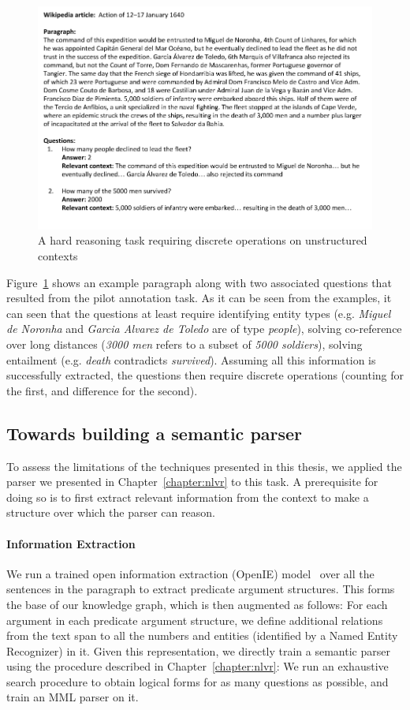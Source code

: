 \begin{figure}
	\includegraphics[width=\textwidth]{figures/drop_example.png}
	\caption{A hard reasoning task requiring discrete operations on
unstructured contexts}\label{fig:drop_example}
\end{figure}

Figure~\ref{fig:drop_example} shows an example paragraph along with two
associated questions that resulted from the pilot annotation task. As it can be
seen from the examples, it can seen that the questions at least require identifying entity types (e.g.
\textit{Miguel de Noronha} and \textit{Garcia Alvarez de Toledo} are of type
\textit{people}), solving co-reference over long distances (\textit{3000 men}
refers to a subset of \textit{5000 soldiers}), solving entailment (e.g.
\textit{death} contradicts \textit{survived}). Assuming all this information is
successfully extracted, the questions then require discrete operations (counting
for the first, and difference for the second).

\subsection{Towards building a semantic parser}
To assess the limitations of the techniques presented in this thesis, we applied
the parser we presented in Chapter~\ref{chapter:nlvr} to this task. A
prerequisite for doing so is to first extract relevant information from the
context to make a structure over which the parser can reason.

\paragraph{Information Extraction}
We run a trained open information extraction
(OpenIE) model~\citep{stanovsky2018supervised} over all the sentences in the
paragraph to extract predicate argument structures. This forms the base of our
knowledge graph, which is then augmented as follows: For each argument in each
predicate argument structure, we define additional relations from the text span
to all the numbers and entities (identified by a Named Entity Recognizer) in it.
Given this representation, we directly train a semantic parser using the
procedure described in Chapter~\ref{chapter:nlvr}: We run an exhaustive search
procedure to obtain logical forms for as many questions as possible, and train
an MML parser on it.

